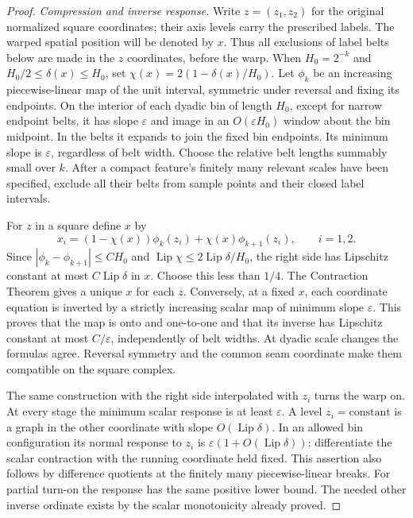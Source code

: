 \documentclass[11pt]{article}
\numberwithin{equation}{section}
\theoremstyle{definition}
\theoremstyle{remark}
\DeclareMathOperator{\Lip}{Lip}
\begin{document}
\begin{proof}
\emph{Compression and inverse response.}
Write $z=(z_1,z_2)$ for the original normalized square coordinates;
their axis levels carry the prescribed labels.  The warped spatial
position will be denoted by $x$.  Thus all exclusions of label belts
below are made in the $z$ coordinates, before the warp.
When $H_0=2^{-k}$ and $H_0/2\le\delta(x)\le H_0$, set
$\chi(x)=2(1-\delta(x)/H_0)$.  Let $\phi_k$ be an increasing
piecewise-linear map of the unit interval, symmetric under reversal
and fixing its endpoints.  On the interior of each dyadic bin of
length $H_0$, except for narrow endpoint belts, it has slope
$\varepsilon$ and image in an $O(\varepsilon H_0)$ window about the
bin midpoint.  In the belts it expands to join the fixed bin
endpoints.  Its minimum slope is $\varepsilon$, regardless of belt
width.  Choose the relative belt lengths summably small over $k$.
After a compact feature's finitely many relevant scales have been
specified, exclude all their belts from sample points and their
closed label intervals.

For $z$ in a square define $x$ by
\begin{equation}
 x_i=(1-\chi(x))\phi_k(z_i)+\chi(x)\phi_{k+1}(z_i),
 \qquad i=1,2.
 \label{ms:warp}
\end{equation}
Since $|\phi_k-\phi_{k+1}|\le C H_0$ and
$\Lip\chi\le 2\Lip\delta/H_0$, the right side has Lipschitz
constant at most $C\Lip\delta$ in $x$.  Choose this less than $1/4$.
The Contraction Theorem gives a unique $x$ for each $z$.  Conversely,
at a fixed $x$, each coordinate equation is inverted by a strictly
increasing scalar map of minimum slope $\varepsilon$.  This proves
that the map is onto and one-to-one and that its inverse has Lipschitz
constant at most $C/\varepsilon$, independently of belt widths.
At dyadic scale changes the formulas agree.  Reversal symmetry and
the common seam coordinate make them compatible on the square
complex.

The same construction with the right side interpolated with $z_i$
turns the warp on.  At every stage the minimum scalar response is
at least $\varepsilon$.  A level $z_i=\text{constant}$ is a graph in
the other coordinate with slope $O(\Lip\delta)$.  In an allowed bin
configuration its normal response to $z_i$ is
$\varepsilon(1+O(\Lip\delta))$: differentiate the scalar contraction
with the running coordinate held fixed.  This assertion also follows
by difference quotients at the finitely many piecewise-linear breaks.
For partial turn-on the response has the same positive lower bound.
The needed other inverse ordinate exists by the scalar monotonicity
already proved.


\end{proof}
\end{document}
